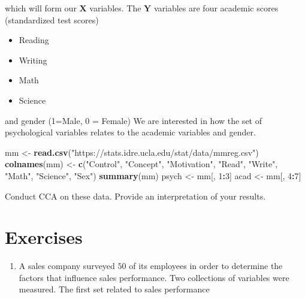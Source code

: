\documentclass[
]{book}
\newenvironment{Shaded}{\begin{snugshade}}{\end{snugshade}}
\newcommand{\DecValTok}[1]{\textcolor[rgb]{0.00,0.00,0.81}{#1}}
\newcommand{\FunctionTok}[1]{\textcolor[rgb]{0.13,0.29,0.53}{\textbf{#1}}}
\newcommand{\NormalTok}[1]{#1}
\newcommand{\OtherTok}[1]{\textcolor[rgb]{0.56,0.35,0.01}{#1}}
\newcommand{\SpecialCharTok}[1]{\textcolor[rgb]{0.81,0.36,0.00}{\textbf{#1}}}
\newcommand{\StringTok}[1]{\textcolor[rgb]{0.31,0.60,0.02}{#1}}
\providecommand{\tightlist}{%
  \setlength{\itemsep}{0pt}\setlength{\parskip}{0pt}}
\theoremstyle{definition}
\theoremstyle{definition}
\theoremstyle{definition}
\theoremstyle{definition}
\theoremstyle{remark}
\begin{document}
which will form our \(\mathbf X\) variables. The \(\mathbf Y\) variables are four academic scores (standardized test scores)

\begin{itemize}
\tightlist
\item
  Reading
\item
  Writing
\item
  Math
\item
  Science
\end{itemize}

and gender (1=Male, 0 = Female) We are interested in how the set of psychological variables relates to the academic variables and gender.

\begin{Shaded}
\begin{Highlighting}[]
\NormalTok{mm }\OtherTok{\textless{}{-}} \FunctionTok{read.csv}\NormalTok{(}\StringTok{"https://stats.idre.ucla.edu/stat/data/mmreg.csv"}\NormalTok{)}
\FunctionTok{colnames}\NormalTok{(mm) }\OtherTok{\textless{}{-}} \FunctionTok{c}\NormalTok{(}\StringTok{"Control"}\NormalTok{, }\StringTok{"Concept"}\NormalTok{, }\StringTok{"Motivation"}\NormalTok{,}
                  \StringTok{"Read"}\NormalTok{, }\StringTok{"Write"}\NormalTok{, }\StringTok{"Math"}\NormalTok{,}
    \StringTok{"Science"}\NormalTok{, }\StringTok{"Sex"}\NormalTok{)}
\FunctionTok{summary}\NormalTok{(mm)}
\NormalTok{psych }\OtherTok{\textless{}{-}}\NormalTok{ mm[, }\DecValTok{1}\SpecialCharTok{:}\DecValTok{3}\NormalTok{]}
\NormalTok{acad }\OtherTok{\textless{}{-}}\NormalTok{ mm[, }\DecValTok{4}\SpecialCharTok{:}\DecValTok{7}\NormalTok{]}
\end{Highlighting}
\end{Shaded}

Conduct CCA on these data. Provide an interpretation of your results.

\section{Exercises}\label{exercises-2}

\begin{enumerate}
\def\labelenumi{\arabic{enumi}.}
\tightlist
\item
  A sales company surveyed \(50\) of its employees in order to determine the factors that influence sales performance. Two collections of variables were measured. The first set related to sales performance
\end{enumerate}
\end{document}
